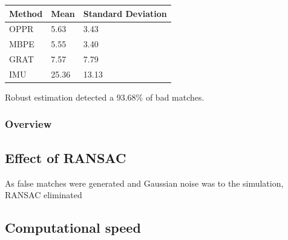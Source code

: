 \begin{table}
	\centering
	\begin{tabular}{| l | l | l |}
		\hline
		Method & Mean & Standard Deviation \\
		\hline
		OPPR &  5.63 \degree & 3.43 \degree \\
		\hline
		MBPE &  5.55 \degree & 3.40 \degree \\
		\hline
		GRAT &  7.57 \degree & 7.79 \degree \\ 
		\hline
		IMU &  25.36 \degree & 13.13 \degree \\ 
		\hline
	\end{tabular}
	\label{cha5:sec1:r2anglet}
\end{table}

Robust estimation detected a $ 93.68 \%$ of bad matches.


\subsubsection{Overview}



\subsection{Effect of RANSAC}

As false matches were generated and Gaussian noise was to the simulation, RANSAC eliminated 


\subsection{Computational speed}